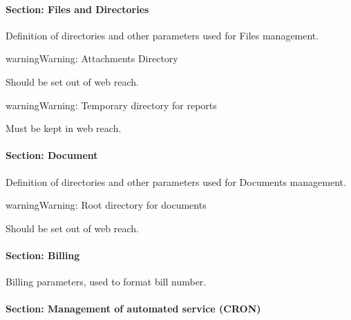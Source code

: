 \documentclass[letterpaper,10pt,english]{sphinxmanual}
\begin{document}
\paragraph{Section: Files and Directories}

Definition of directories and other parameters used for Files management.

\begin{notice}{warning}{Warning:}
Attachments Directory

Should be set out of web reach.
\end{notice}

\begin{notice}{warning}{Warning:}
Temporary directory for reports

Must be kept in web reach.
\end{notice}
\paragraph{Section: Document}

Definition of directories and other parameters used for Documents management.

\begin{notice}{warning}{Warning:}
Root directory for documents

Should be set out of web reach.
\end{notice}
\paragraph{Section: Billing}

Billing parameters, used to format bill number.
\paragraph{Section: Management of automated service (CRON)}
\end{document}
